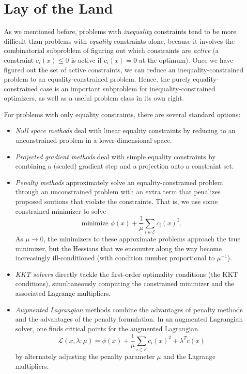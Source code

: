 \documentclass[12pt, leqno]{article} %
\begin{document}
\section{Lay of the Land}

As we mentioned before, problems with {\em inequality} constraints
tend to be more difficult than problems with {\em equality}
constraints alone, because it involves the combinatorial subproblem
of figuring out which constraints are {\em active}
(a constraint $c_i(x) \leq 0$ is active if $c_i(x) = 0$ at the optimum).
Once we have figured out the set of active constraints, we can reduce
an inequality-constrained problem to an equality-constrained problem.
Hence, the purely equality-constrained case is an important subproblem
for inequality-constrained optimizers, as well as a useful problem
class in its own right.

For problems with only equality constraints, there are several
standard options:
\begin{itemize}
\item
  {\em Null space methods} deal with linear equality constraints
  by reducing to an unconstrained problem in a lower-dimensional space.
\item
  {\em Projected gradient methods} deal with simple equality
  constraints by combining a (scaled) gradient step and a projection
  onto a constraint set.
\item
  {\em Penalty methods} approximately solve an equality-constrained
  problem through an unconstrained problem with an extra term that
  penalizes proposed soutions that violate the constraints.  That is,
  we use some constrained minimizer to solve
  \[
    \mbox{minimize } \phi(x) + \frac{1}{\mu} \sum_{i \in\mathcal{E}} c_i(x)^2.
  \]
  As $\mu \rightarrow 0$, the minimizers to these approximate problems
  approach the true minimizer, but the Hessians that we encounter
  along the way become increasingly ill-conditioned (with condition
  number proportional to $\mu^{-1}$).
\item
  {\em KKT solvers} directly tackle the first-order optimality
  conditions (the KKT conditions), simultaneously computing the
  constrained minimizer and the associated Lagrange multipliers.
\item
  {\em Augmented Lagrangian} methods combine the advantages of penalty
  methods and the advantages of the penalty formulation.  In an
  augmented Lagrangian solver, one finds critical points for the
  augmented Lagrangian
  \[
  \mathcal{L}(x, \lambda; \mu) =
    \phi(x) + \frac{1}{\mu} \sum_{i \in \mathcal{E}} c_i(x)^2 + \lambda^T c(x)
   \]
  by alternately adjusting the penalty parameter $\mu$ and the
  Lagrange multipliers.
\end{itemize}
\end{document}
